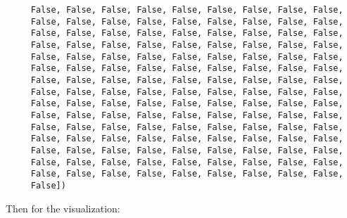 \documentclass[letterpaper]{article}
\begin{document}
\begin{minipage}{\linewidth}
	\begin{Verbatim}
     False, False, False, False, False, False, False, False, False,
     False, False, False, False, False, False, False, False, False,
     False, False, False, False, False, False, False, False, False,
     False, False, False, False, False, False, False, False, False,
     False, False, False, False, False, False, False, False, False,
     False, False, False, False, False, False, False, False, False,
     False, False, False, False, False, False, False, False, False,
     False, False, False, False, False, False, False, False, False,
     False, False, False, False, False, False, False, False, False,
     False, False, False, False, False, False, False, False, False,
     False, False, False, False, False, False, False, False, False,
     False, False, False, False, False, False, False, False, False,
     False, False, False, False, False, False, False, False, False,
     False, False, False, False, False, False, False, False, False,
     False, False, False, False, False, False, False, False, False,
     False])
	\end{Verbatim}
\end{minipage}

Then for the visualization:
\end{document}
